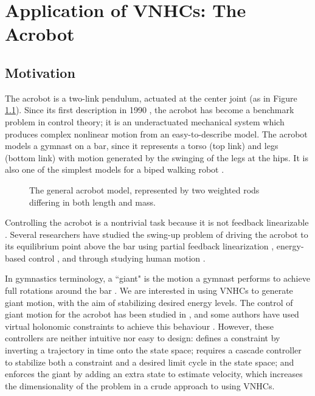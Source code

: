 

\chapter{Application of VNHCs: The Acrobot}\label{ch:acrobot}
\section{Motivation}
The acrobot is a two-link pendulum, actuated at the center joint (as in Figure
\ref{fig:acrobot-model}). 
Since its first description in 1990
\cite{nonlinear_controllers_nonintegrable_acrobot}, the acrobot has become a
benchmark problem in control theory; 
it is an underactuated mechanical system which produces complex nonlinear motion
from an easy-to-describe model.
The acrobot models a gymnast on a bar, since it represents a torso (top link)
and legs (bottom link) with motion generated by the swinging of the legs at the
hips. 
It is also one of the simplest models for a biped walking robot
\cite{toward_framework_biped_locomotion}.

\begin{figure}
    \centering
    
    \caption{The general acrobot model, represented by two weighted rods
    differing in both length and mass.}%
    \label{fig:acrobot-model}
\end{figure}

Controlling the acrobot is a nontrivial task because it is not feedback
linearizable \cite{nonlinear_controllers_nonintegrable_acrobot}. 
Several researchers have studied the swing-up problem of driving the acrobot to
its equilibrium point above the bar using partial feedback linearization
\cite{swingup_problem_acrobot}, energy-based control
\cite{swingup_acrobot_pendulum, swingup_acrobot_energy}, and through studying
human motion \cite{swingup_giant_acrobot, motion_control_gymnastic_skill}.

In gymnastics terminology, a ``giant" is the motion a gymnast performs to
achieve full rotations around the bar \cite{usagym_giant}. 
We are interested in using VNHCs to generate giant motion, with the aim of
stabilizing desired energy levels.
The control of giant motion for the acrobot has been studied in
\cite{energy_pumping_robotic_swinging, swingup_giant_acrobot}, 
and some authors have used virtual holonomic constraints to achieve this
behaviour
\cite{dynamical_servo_acrobot_vc, control_giant_two_link_gymnastic_robot,
xingbo_thesis}. 
However, these controllers are neither intuitive nor easy to
design:
\cite{control_giant_two_link_gymnastic_robot} defines a constraint by inverting
a trajectory in time onto the state space; 
\cite{dynamical_servo_acrobot_vc} requires a cascade controller to stabilize
both a constraint and a desired limit cycle in the state space; 
and \cite{xingbo_thesis} enforces the giant by adding an extra state to estimate
velocity, which increases the dimensionality of the problem in a crude
approach to using VNHCs.

